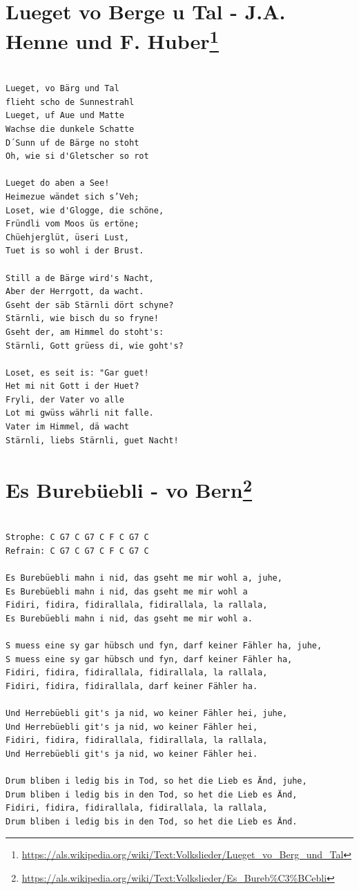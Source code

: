 \documentclass[
]{book}
\let\stdsection\section
\renewcommand\section{\clearpage\stdsection}
\begin{document}
\hypertarget{volkslieder-lueged-vo-berge-u-tal}{%
\section[Lueget vo Berge u Tal - J.A. Henne und F. Huber]{\texorpdfstring{Lueget vo Berge u Tal - J.A. Henne und F. Huber\footnote{\url{https://als.wikipedia.org/wiki/Text:Volkslieder/Lueget_vo_Berg_und_Tal}}}{Lueget vo Berge u Tal - J.A. Henne und F. Huber}}\label{volkslieder-lueged-vo-berge-u-tal}}

\begin{verbatim}

Lueget, vo Bärg und Tal
flieht scho de Sunnestrahl
Lueget, uf Aue und Matte
Wachse die dunkele Schatte
D´Sunn uf de Bärge no stoht
Oh, wie si d'Gletscher so rot

Lueget do aben a See!
Heimezue wändet sich s’Veh;
Loset, wie d'Glogge, die schöne,
Fründli vom Moos üs ertöne;
Chüehjerglüt, üseri Lust,
Tuet is so wohl i der Brust.

Still a de Bärge wird's Nacht,
Aber der Herrgott, da wacht.
Gseht der säb Stärnli dört schyne?
Stärnli, wie bisch du so fryne!
Gseht der, am Himmel do stoht's:
Stärnli, Gott grüess di, wie goht's?

Loset, es seit is: "Gar guet!
Het mi nit Gott i der Huet?
Fryli, der Vater vo alle
Lot mi gwüss währli nit falle.
Vater im Himmel, dä wacht
Stärnli, liebs Stärnli, guet Nacht! 
\end{verbatim}

\hypertarget{volkslieder-es-burebuebli}{%
\section[Es Burebüebli - vo Bern]{\texorpdfstring{Es Burebüebli - vo Bern\footnote{\url{https://als.wikipedia.org/wiki/Text:Volkslieder/Es_Bureb\%C3\%BCebli}}}{Es Burebüebli - vo Bern}}\label{volkslieder-es-burebuebli}}

\begin{verbatim}

Strophe: C G7 C G7 C F C G7 C
Refrain: C G7 C G7 C F C G7 C

Es Burebüebli mahn i nid, das gseht me mir wohl a, juhe,
Es Burebüebli mahn i nid, das gseht me mir wohl a
Fidiri, fidira, fidirallala, fidirallala, la rallala,
Es Burebüebli mahn i nid, das gseht me mir wohl a.

S muess eine sy gar hübsch und fyn, darf keiner Fähler ha, juhe,
S muess eine sy gar hübsch und fyn, darf keiner Fähler ha,
Fidiri, fidira, fidirallala, fidirallala, la rallala,
Fidiri, fidira, fidirallala, darf keiner Fähler ha.

Und Herrebüebli git's ja nid, wo keiner Fähler hei, juhe,
Und Herrebüebli git's ja nid, wo keiner Fähler hei,
Fidiri, fidira, fidirallala, fidirallala, la rallala,
Und Herrebüebli git's ja nid, wo keiner Fähler hei.

Drum bliben i ledig bis in Tod, so het die Lieb es Änd, juhe,
Drum bliben i ledig bis in den Tod, so het die Lieb es Änd,
Fidiri, fidira, fidirallala, fidirallala, la rallala,
Drum bliben i ledig bis in den Tod, so het die Lieb es Änd.
\end{verbatim}
\end{document}
